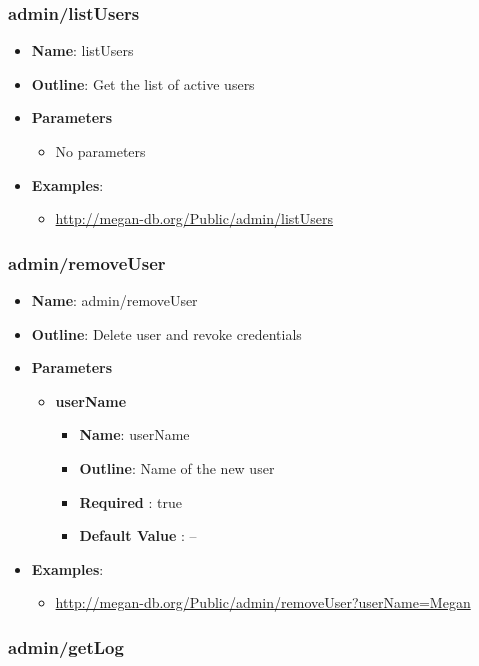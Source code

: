 \documentclass[11pt]{article}
\begin{document}
\subsubsection{admin/listUsers}
\label{subsubsec:userInterface}
\begin{itemize}
	\item \textbf{Name}: listUsers
	\item \textbf{Outline}: Get the list of active users
	\item \textbf{Parameters}
		\begin{itemize}
			\item No parameters
		\end{itemize}
	\item \textbf{Examples}:
		\begin{itemize}
			\item \url{http://megan-db.org/Public/admin/listUsers}
		\end{itemize}
\end{itemize}
\subsubsection{admin/removeUser}
\begin{itemize}
	\item \textbf{Name}: admin/removeUser
	\item \textbf{Outline}: Delete user and revoke credentials
	\item \textbf{Parameters}
		\begin{itemize}
			\item \textbf{userName}
				\begin{itemize}
					\item \textbf{Name}: userName
					\item \textbf{Outline}: Name of the new user
					\item \textbf{Required} : true
					\item \textbf{Default Value} : --
				\end{itemize}
		\end{itemize}
	\item \textbf{Examples}:
		\begin{itemize}
			\item \url{http://megan-db.org/Public/admin/removeUser?userName=Megan}
		\end{itemize}
\end{itemize}
\subsubsection{admin/getLog}
\end{document}
